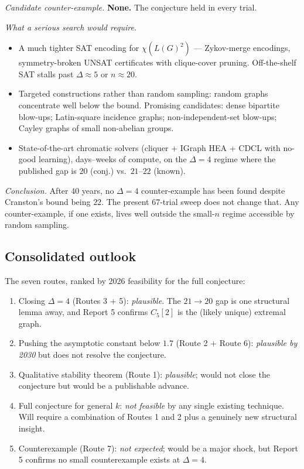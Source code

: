 \documentclass[11pt]{article}
\begin{document}
\emph{Candidate counter-example.} \textbf{None.} The conjecture held
in every trial.

\emph{What a serious search would require.}
\begin{itemize}[leftmargin=*, itemsep=2pt]
  \item A much tighter SAT encoding for $\chi(L(G)^2)$ ---
        Zykov-merge encodings, symmetry-broken UNSAT certificates
        with clique-cover pruning. Off-the-shelf SAT stalls past
        $\Delta \approx 5$ or $n \approx 20$.
  \item Targeted constructions rather than random sampling: random
        graphs concentrate well below the bound. Promising
        candidates: dense bipartite blow-ups; Latin-square incidence
        graphs; non-independent-set blow-ups; Cayley graphs of small
        non-abelian groups.
  \item State-of-the-art chromatic solvers (cliquer + IGraph HEA +
        CDCL with no-good learning), days--weeks of compute, on the
        $\Delta = 4$ regime where the published gap is $20$ (conj.)
        vs.\ $21$--$22$ (known).
\end{itemize}

\emph{Conclusion.} After $40$ years, no $\Delta = 4$ counter-example
has been found despite Cranston's bound being $22$. The present
67-trial sweep does not change that. Any counter-example, if one
exists, lives well outside the small-$n$ regime accessible by random
sampling.

\subsection*{Consolidated outlook}

The seven routes, ranked by 2026 feasibility for the full conjecture:

\begin{enumerate}[leftmargin=*, itemsep=2pt]
  \item Closing $\Delta = 4$ (Routes 3 + 5): \emph{plausible}. The
        $21 \to 20$ gap is one structural lemma away, and Report 5
        confirms $C_5[2]$ is the (likely unique) extremal graph.
  \item Pushing the asymptotic constant below $1.7$ (Route 2 +
        Route 6): \emph{plausible by 2030} but does not resolve the
        conjecture.
  \item Qualitative stability theorem (Route 1):
        \emph{plausible}; would not close the conjecture but would
        be a publishable advance.
  \item Full conjecture for general $k$: \emph{not feasible} by any
        single existing technique. Will require a combination of
        Routes 1 and 2 plus a genuinely new structural insight.
  \item Counterexample (Route 7): \emph{not expected}; would be a
        major shock, but Report 5 confirms no small counterexample
        exists at $\Delta = 4$.
\end{enumerate}
\end{document}
